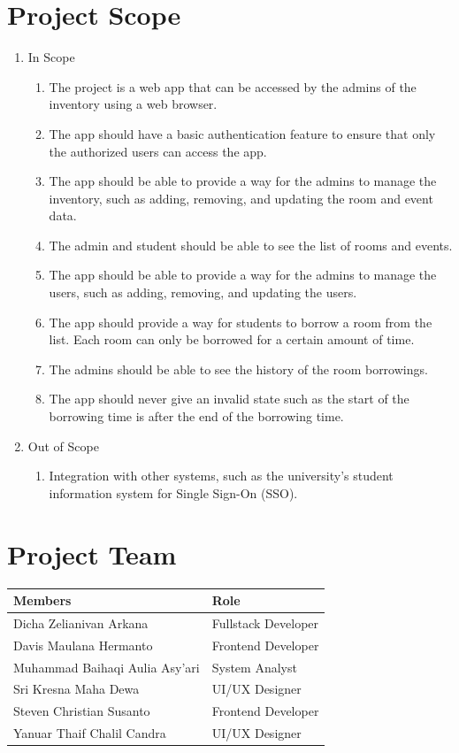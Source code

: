 \documentclass[12pt,titlepage,a4paper]{report}
\begin{document}
    \section{Project Scope}
    \begin{enumerate}[label=\alph*.]
        \item In Scope
        \begin{enumerate}[label=\roman*.]
            \item The project is a web app that can be accessed by the admins of the inventory using a web browser.
            \item The app should have a basic authentication feature to ensure that only the authorized users can access the app.
            \item The app should be able to provide a way for the admins to manage the inventory, such as adding, removing, and updating the room and event data.
            \item The admin and student should be able to see the list of rooms and events.
            \item The app should be able to provide a way for the admins to manage the users, such as adding, removing, and updating the users.
            \item The app should provide a way for students to borrow a room from the list. Each room can only be borrowed for a certain amount of time.
            \item The admins should be able to see the history of the room borrowings.
            \item The app should never give an invalid state such as the start of the borrowing time is after the end of the borrowing time.
        \end{enumerate}
        \item Out of Scope
        \begin{enumerate}[label=\roman*.]
            \item Integration with other systems, such as the university's student information system for Single Sign-On (SSO).
        \end{enumerate}
    \end{enumerate}
    \section{Project Team}
    \begin{tabular}{|l|l|}
        \hline
        Members & Role \\
        \hline
        Dicha Zelianivan Arkana & Fullstack Developer \\
        \hline
        Davis Maulana Hermanto & Frontend Developer \\
        \hline
        Muhammad Baihaqi Aulia Asy'ari & System Analyst \\
        \hline
        Sri Kresna Maha Dewa & UI\slash UX Designer \\
        \hline
        Steven Christian Susanto & Frontend Developer \\
        \hline
        Yanuar Thaif Chalil Candra & UI\slash UX Designer \\
        \hline
    \end{tabular}
\end{document}
